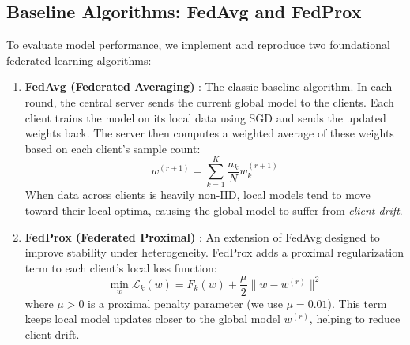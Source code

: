 \subsection{Baseline Algorithms: FedAvg and FedProx}
To evaluate model performance, we implement and reproduce two foundational federated learning algorithms:
\begin{enumerate}
    \item \textbf{FedAvg (Federated Averaging)} \cite{mcmahan2017communication}: The classic baseline algorithm. In each round, the central server sends the current global model to the clients. Each client trains the model on its local data using SGD and sends the updated weights back. The server then computes a weighted average of these weights based on each client's sample count:
    \begin{equation}
        w^{(r+1)} = \sum_{k=1}^K \frac{n_k}{N} w_k^{(r+1)}
        \label{eq:fedavg_simple}
    \end{equation}
    When data across clients is heavily non-IID, local models tend to move toward their local optima, causing the global model to suffer from \textit{client drift}.

    \item \textbf{FedProx (Federated Proximal)} \cite{li2020federated}: An extension of FedAvg designed to improve stability under heterogeneity. FedProx adds a proximal regularization term to each client's local loss function:
    \begin{equation}
        \min_{w} \mathcal{L}_k(w) = F_k(w) + \frac{\mu}{2} \|w - w^{(r)}\|^2
        \label{eq:fedprox_simple}
    \end{equation}
    where $\mu > 0$ is a proximal penalty parameter (we use $\mu = 0.01$). This term keeps local model updates closer to the global model $w^{(r)}$, helping to reduce client drift.
\end{enumerate}

